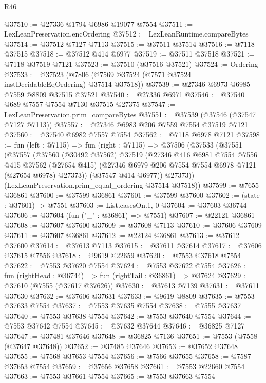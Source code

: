 \begin{lexlean}{R46}
\begin{coremodule}
@37510 := @27336 @1794 @6986 @19077 @7554
@37511 := LexLeanPreservation.encOrdering
@37512 := LexLeanRuntime.compareBytes
@37514 := @37512 @7127 @7113
@37515 := @37511 @37514
@37516 := @7118 @37515
@37518 := @37512 @414 @6977
@37519 := @37511 @37518
@37521 := @7118 @37519 @7121
@37523 := @37510 (@37516 @37521)
@37524 := Ordering
@37533 := @37523 (@7806 (@7569 @37524 (@7571 @37524 instDecidableEqOrdering) @37514 @37518))
@37539 := @27346 @6973 @6985 @7559 @8809 @37515 @37521
@37540 := @27336 @6971
@37546 := @37540 @689 @7557 @7554 @7130 @37515 @27375
@37547 := LexLeanPreservation.prim_compareBytes
@37551 := @37539 (@37546 (@37547 @7127 @7113))
@37557 := @27346 @6983 @206 @7559 @7554 @37519 @7121
@37560 := @37540 @6982 @7557 @7554
@37562 := @7118 @6978 @7121
@37598 := fun (left : @7115) =>
  fun (right : @7115) =>
  @37506
    (@37533
      (@37551
        (@37557
          (@37560
            (@30492 @37562)
            @37519
            (@27346
              @416
              @6981
              @7554
              @7556
              @415
              @37562
              (@27654 @415)
              (@27346 @6979 @206 @7554 @7554 @6978 @7121 (@27654 @6978) @27373))
            (@37547 @414 @6977))
          @27373))
      (LexLeanPreservation.prim_equal_ordering @37514 @37518))
@37599 := @7655 @36861
@37600 := @37599 @36861
@37601 := @37599 @37600
@37602 := (state : @37601) -> @7551
@37603 := List.casesOn.{1, 0}
@37604 := @37603 @36744
@37606 := @37604 (fun ("_" : @36861) => @7551)
@37607 := @22121 @36861
@37608 := @37607 @37600
@37609 := @37608 @7113
@37610 := @37606 @37609
@37611 := @37607 @36861
@37612 := @22124 @36861
@37613 := @37612 @37600
@37614 := @37613 @7113
@37615 := @37611 @37614
@37617 := @37606 @37615 @7556
@37618 := @9619 @22659
@37620 := @7553 @37618 @7554
@37622 := @7553 @37620 @7554
@37624 := @7553 @37622 @7554
@37626 := fun (rightHead : @36744) => fun (rightTail : @36861) => @37624
@37629 := @37610 (@7555 (@37617 @37626))
@37630 := @37613 @7139
@37631 := @37611 @37630
@37632 := @37606 @37631
@37633 := @9619 @8809
@37635 := @7553 @37633 @7554
@37637 := @7553 @37635 @7554
@37638 := @7555 @37637
@37640 := @7553 @37638 @7554
@37642 := @7553 @37640 @7554
@37644 := @7553 @37642 @7554
@37645 := @37632 @37644
@37646 := @36825 @7127
@37647 := @37481 @37646
@37648 := @36825 @7136
@37651 := @7553 (@7558 (@37647 @37648))
@37652 := @37485 @37646
@37653 := @37652 @37648
@37655 := @7568 @37653 @7554
@37656 := @7566 @37655
@37658 := @7587 @37653 @7554
@37659 := @37656 @37658
@37661 := @7553 @22660 @7554
@37663 := @7553 @37661 @7554
@37665 := @7553 @37663 @7554

\end{coremodule}
\end{lexlean}
